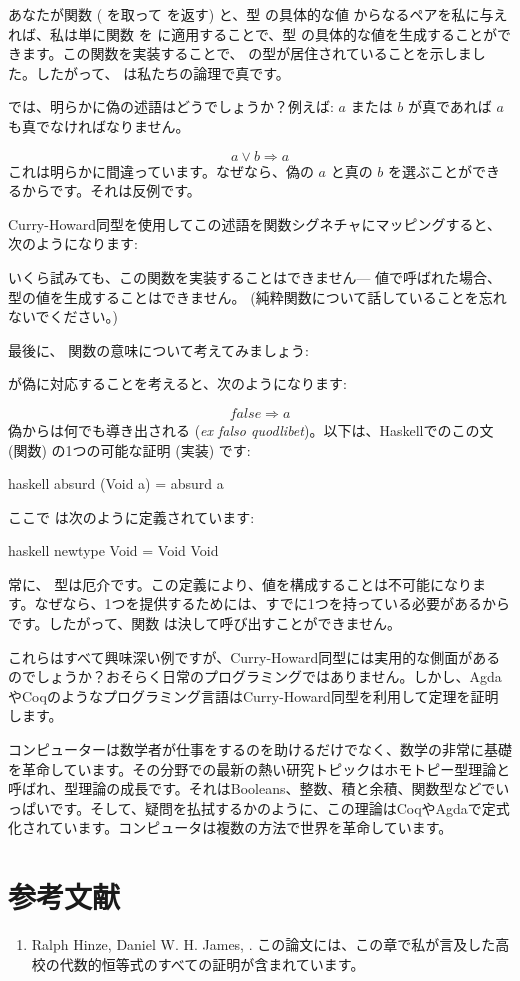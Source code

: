 あなたが関数  ( を取って  を返す) と、型  の具体的な値  からなるペアを私に与えれば、私は単に関数  を  に適用することで、型  の具体的な値を生成することができます。この関数を実装することで、 の型が居住されていることを示しました。したがって、 は私たちの論理で真です。

では、明らかに偽の述語はどうでしょうか？例えば: $a$ または $b$ が真であれば $a$ も真でなければなりません。

\[a \vee b \Rightarrow a\]
これは明らかに間違っています。なぜなら、偽の $a$ と真の $b$ を選ぶことができるからです。それは反例です。

Curry-Howard同型を使用してこの述語を関数シグネチャにマッピングすると、次のようになります: 

いくら試みても、この関数を実装することはできません--- 値で呼ばれた場合、 型の値を生成することはできません。 (純粋関数について話していることを忘れないでください。) 

最後に、 関数の意味について考えてみましょう: 

 が偽に対応することを考えると、次のようになります: 

\[\mathit{false} \Rightarrow a\]
偽からは何でも導き出される (\emph{ex falso quodlibet})。以下は、Haskellでのこの文 (関数) の1つの可能な証明 (実装) です: 

\begin{snip}{haskell}
absurd (Void a) = absurd a
\end{snip}
ここで  は次のように定義されています: 

\begin{snip}{haskell}
newtype Void = Void Void
\end{snip}
常に、 型は厄介です。この定義により、値を構成することは不可能になります。なぜなら、1つを提供するためには、すでに1つを持っている必要があるからです。したがって、関数  は決して呼び出すことができません。

これらはすべて興味深い例ですが、Curry-Howard同型には実用的な側面があるのでしょうか？おそらく日常のプログラミングではありません。しかし、AgdaやCoqのようなプログラミング言語はCurry-Howard同型を利用して定理を証明します。

コンピューターは数学者が仕事をするのを助けるだけでなく、数学の非常に基礎を革命しています。その分野での最新の熱い研究トピックはホモトピー型理論と呼ばれ、型理論の成長です。それはBooleans、整数、積と余積、関数型などでいっぱいです。そして、疑問を払拭するかのように、この理論はCoqやAgdaで定式化されています。コンピュータは複数の方法で世界を革命しています。

\section{参考文献}

\begin{enumerate}
  \tightlist
  \item
        Ralph Hinze, Daniel W. H. James,
        . この論文には、この章で私が言及した高校の代数的恒等式のすべての証明が含まれています。
\end{enumerate}

